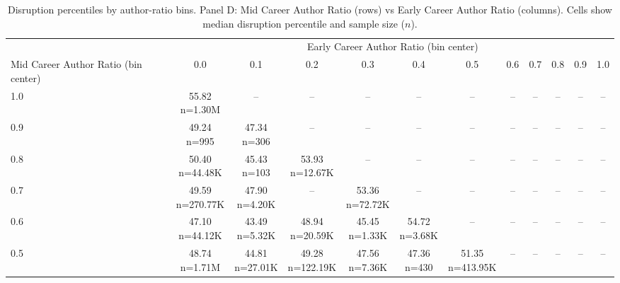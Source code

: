 \begin{table}\centering
            \caption{Disruption percentiles by author-ratio bins. Panel D: Mid Career Author Ratio (rows) vs Early Career Author Ratio (columns). Cells show median disruption percentile and sample size ($n$).}
            \scriptsize
            \setlength\tabcolsep{4pt}
            \renewcommand{\arraystretch}{1.1}
            \begin{tabular}{lccccccccccc}
            \toprule
            & \multicolumn{11}{c}{Early Career Author Ratio (bin center)} \\
            \cmidrule(lr){2-12}
            Mid Career Author Ratio (bin center) & 0.0 & 0.1 & 0.2 & 0.3 & 0.4 & 0.5 & 0.6 & 0.7 & 0.8 & 0.9 & 1.0 \\
            \midrule
            1.0 & \makecell{55.82 \\ \scriptsize n=1.30M} & -- & -- & -- & -- & -- & -- & -- & -- & -- & -- \\
0.9 & \makecell{49.24 \\ \scriptsize n=995} & \makecell{47.34 \\ \scriptsize n=306} & -- & -- & -- & -- & -- & -- & -- & -- & -- \\
0.8 & \makecell{50.40 \\ \scriptsize n=44.48K} & \makecell{45.43 \\ \scriptsize n=103} & \makecell{53.93 \\ \scriptsize n=12.67K} & -- & -- & -- & -- & -- & -- & -- & -- \\
0.7 & \makecell{49.59 \\ \scriptsize n=270.77K} & \makecell{47.90 \\ \scriptsize n=4.20K} & -- & \makecell{53.36 \\ \scriptsize n=72.72K} & -- & -- & -- & -- & -- & -- & -- \\
0.6 & \makecell{47.10 \\ \scriptsize n=44.12K} & \makecell{43.49 \\ \scriptsize n=5.32K} & \makecell{48.94 \\ \scriptsize n=20.59K} & \makecell{45.45 \\ \scriptsize n=1.33K} & \makecell{54.72 \\ \scriptsize n=3.68K} & -- & -- & -- & -- & -- & -- \\
0.5 & \makecell{48.74 \\ \scriptsize n=1.71M} & \makecell{44.81 \\ \scriptsize n=27.01K} & \makecell{49.28 \\ \scriptsize n=122.19K} & \makecell{47.56 \\ \scriptsize n=7.36K} & \makecell{47.36 \\ \scriptsize n=430} & \makecell{51.35 \\ \scriptsize n=413.95K} & -- & -- & -- & -- & -- \\

\end{tabular}
\end{table}
